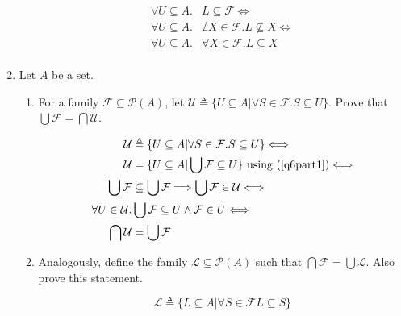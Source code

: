 \documentclass[10pt,\jkfside,a4paper]{article}
\begin{document}
\begin{enumerate}
\begin{enumerate}
\begin{equation}\label{q6part2}
\begin{split}
\forall U \subseteq A.& L \subseteq \mathcal{F} \Longleftrightarrow\\
\forall U \subseteq A.& \nexists X \in \mathcal{F}. L \nsubseteq X \Longleftrightarrow\\
\forall U \subseteq A.& \forall X \in \mathcal{F}. L \subseteq X\\
\end{split}
\end{equation}

\end{enumerate}

\item Let $A$ be a set.

\begin{enumerate}

\item For a family $\mathcal{F} \subseteq \mathcal{P}(A)$, let $\mathcal{U} \triangleq \{ U \subseteq A| \forall S \in \mathcal{F}. S \subseteq U\}$. 
Prove that $\bigcup\mathcal{F} = \bigcap\mathcal{U}$.

\begin{equation}
\begin{split}
\mathcal{U} &\triangleq \{ U \subseteq A| \forall S \in \mathcal{F}. S \subseteq U\} \Longleftrightarrow\\
\mathcal{U} &= \{ U \subseteq A| \bigcup \mathcal{F} \subseteq U\} \text{ using (\ref{q6part1})}\Longleftrightarrow\\
\bigcup \mathcal{F} &\subseteq \bigcup \mathcal{F} \Longrightarrow \bigcup \mathcal{F} \in \mathcal{U} \Longleftrightarrow\\
\forall U \in \mathcal{U}. &\bigcup \mathcal{F} \subseteq U \wedge \mathcal{F} \in U \Longleftrightarrow\\
\bigcap \mathcal{U} &= \bigcup \mathcal{F}\\
\end{split}
\end{equation}

\item Analogously, define the family $\mathcal{L}\subseteq \mathcal{P}(A)$ such that $\bigcap \mathcal{F} = \bigcup \mathcal{L}$. Also prove this statement.

\begin{equation*}
\mathcal{L} \triangleq \{ L \subseteq A | \forall S \in \mathcal{F} L \subseteq S \}
\end{equation*}


\end{enumerate}
\end{enumerate}
\end{document}
